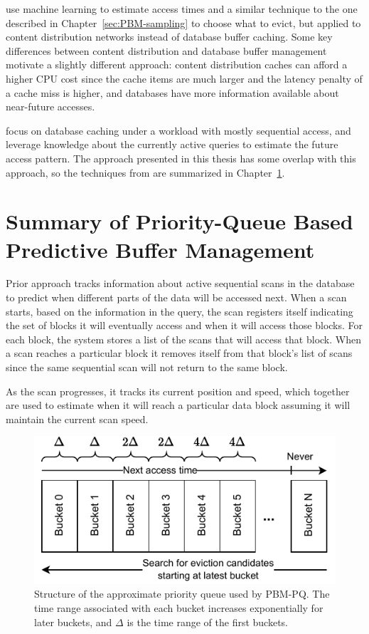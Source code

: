 \citet{relaxedBelady} use machine learning to estimate access times and a similar technique to the one described in Chapter~\ref{sec:PBM-sampling} to choose what to evict, but applied to content distribution networks instead of database buffer caching. Some key differences between content distribution and database buffer management motivate a slightly different approach: content distribution caches can afford a higher CPU cost since the cache items are much larger and the latency penalty of a cache miss is higher, and databases have more information available about near-future accesses.

\citet{pbm} focus on database caching under a workload with mostly sequential access, and leverage knowledge about the currently active queries to estimate the future access pattern. The approach presented in this thesis has some overlap with this approach, so the techniques from \cite{pbm} are summarized in Chapter~\ref{sec:pbm-pq_summary}.

\section{Summary of Priority-Queue Based Predictive Buffer Management}
\label{sec:pbm-pq_summary}

Prior approach \cite{pbm} tracks information about active sequential scans in the database to predict when different parts of the data will be accessed next.
When a scan starts, based on the information in the query, the scan registers itself indicating the set of blocks it will eventually access and when it will access those blocks. For each block, the system stores a list of the scans that will access that block. When a scan reaches a particular block it removes itself from that block's list of scans since the same sequential scan will not return to the same block.

As the scan progresses, it tracks its current position and speed, which together are used to estimate when it will reach a particular data block assuming it will maintain the current scan speed.

\begin{figure}[htb]
    \centering
    \includegraphics[width=1\columnwidth]{figures/Diagrams/diagrams-approx-PQ.pdf}
    \caption{Structure of the approximate priority queue used by PBM-PQ. The time range associated with each bucket increases exponentially for later buckets, and $\Delta$ is the time range of the first buckets.}
    \label{fig:approx-pq}
\end{figure}

